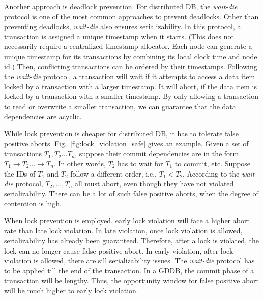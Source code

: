 \documentclass[conference]{IEEEtran}
\begin{document}

Another approach is deadlock prevention.
For distributed DB, the \emph{wait-die} protocol is one of the most common approaches to prevent deadlocks.
Other than preventing deadlocks, \emph{wait-die} also ensures serializability.
In this protocol, a transaction is assigned a unique timestamp when it starts.
(This does not necessarily require a centralized timestamp allocator.
Each node can generate a unique timestamp for its transactions by combining its local clock time and node id.)
Then, conflicting transactions can be ordered by their timestamps.
Following the \emph{wait-die} protocol, a transaction will wait if it attempts to access a data item locked by a transaction with a larger timestamp.
It will abort, if the data item is locked by a transaction with a smaller timestamp.
By only allowing a transaction to read or overwrite a smaller transaction, we can guarantee that the data dependencies are acyclic.


While lock prevention is cheaper for distributed DB, it has to tolerate false positive aborts.
Fig.~\ref{fig:lock_violation_safe} gives an example.
Given a set of transactions ${T_1, T_2... T_n}$, suppose their commit dependencies are in the form ${T_1 \rightarrow T_2 ... \rightarrow T_n}$.
In other words, ${T_2}$ has to wait for ${T_1}$ to commit, etc.
Suppose the IDs of ${T_1}$ and ${T_2}$ follow a different order, i.e., ${T_1 < T_2}$.
According to the \emph{wait-die} protocol, ${T_2, ..., T_n}$ all must abort, even though they have not violated serializability.
There can be a lot of such false positive aborts, when the degree of contention is high. 


When lock prevention is employed, early lock violation will face a higher abort rate than late lock violation.
In late violation, once lock violation is allowed, serializability has already been guaranteed. Therefore, after a lock is violated, the lock can no longer cause false positive abort.
In early violation, after lock violation is allowed, there are sill serializability issues. The \emph{wait-die} protocol has to be applied till the end of the transaction.
In a GDDB, the commit phase of a transaction will be lengthy. Thus, the opportunity window for false positive abort will be much higher to early lock violation.    
\end{document}
